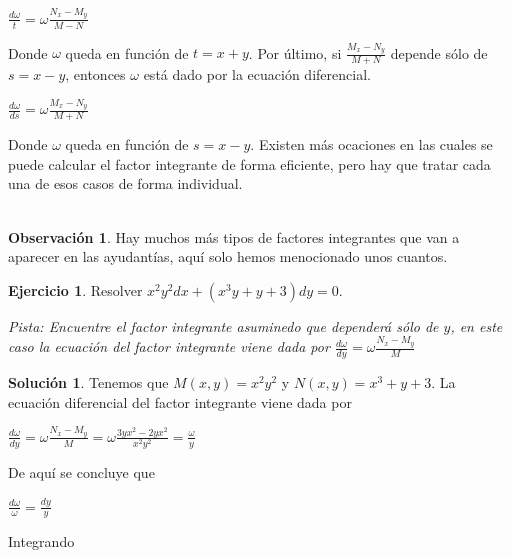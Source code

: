 \documentclass{article}
\theoremstyle{plain}
\theoremstyle{definition}
\newtheorem{ejer}[thm]{Ejercicio}
\newtheorem{sol}[thm]{Solución}
\newtheorem{rmk}[thm]{Observación}
\begin{document}
\begin{center}
$\displaystyle  \frac{d\omega}{t}= \omega\frac{N_x-M_y}{M-N}$
\end{center}

Donde $\omega$ queda en función de $t=x+y$. Por último, si $\displaystyle \frac{M_x-N_y}{M+N}$ depende sólo de $s=x-y$, entonces $\omega$ está dado por la  ecuación diferencial.

\begin{center}
$\displaystyle  \frac{d\omega}{ds}= \omega\frac{M_x-N_y}{M+N}$
\end{center}

Donde $\omega$ queda en función de $s=x-y$. Existen más ocaciones en las cuales se puede calcular el factor integrante de forma eficiente, pero hay que tratar cada una de esos casos de forma individual. \\ \\

\begin{rmk}Hay muchos más tipos de factores integrantes que van a aparecer en las ayudantías, aquí solo hemos menocionado unos cuantos. \\
\end{rmk}


\begin{ejer}Resolver $x^2y^2dx+ (x^3y+y+3)dy=0$. \\
\end{ejer}

\textit{Pista: Encuentre el factor integrante asuminedo que dependerá sólo de $y$, en este caso la ecuación del factor integrante viene dada por  $\displaystyle  \frac{d\omega}{dy}=  \omega \frac{N_x-M_y}{M}$ } \\

\begin{sol}Tenemos que $M(x,y)= x^2y^2$ y $N(x,y)= x^3+y+3$. La ecuación diferencial del factor integrante viene dada por
\end{sol}


\begin{center}
$\displaystyle  \frac{d\omega}{dy}=  \omega \frac{N_x-M_y}{M} = \omega\frac{3yx^2-2yx^2}{x^2y^2}= \frac{\omega}{y}$
\end{center}


De aquí se concluye que

\begin{center}
$\displaystyle \frac{d\omega}{\omega} = \frac{dy}{y}$
\end{center}

Integrando
\end{document}
